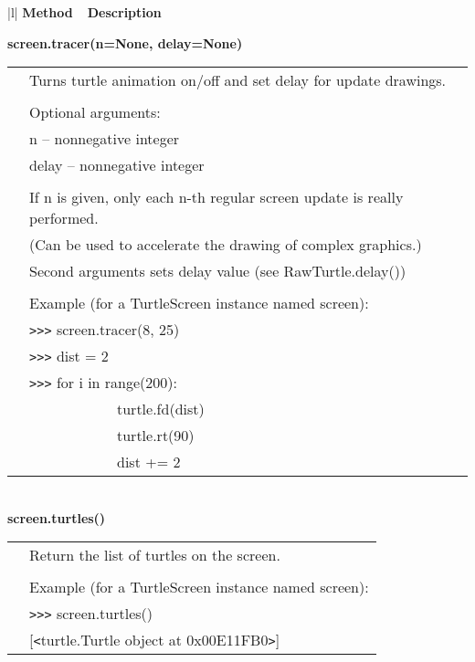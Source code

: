 \begin{center}
{\small
\begin{tabular}{|l|} \hline
{\bf Method~~Description}  \\ \hline\hline 



{\bf    screen.tracer(n=None, delay=None)} \\
   \begin{tabular}{p{0.25in}p{4in}}
&        Turns turtle animation on/off and set delay for update drawings. \\
&  \\
&        Optional arguments: \\
&        n -- nonnegative  integer \\
&        delay -- nonnegative  integer \\
&  \\
&        If n is given, only each n-th regular screen update is really performed. \\
&        (Can be used to accelerate the drawing of complex graphics.) \\
&        Second arguments sets delay value (see RawTurtle.delay()) \\
&  \\
&        Example (for a TurtleScreen instance named screen): \\
&        \verb+>+\verb+>+\verb+>+ screen.tracer(8, 25) \\
&        \verb+>+\verb+>+\verb+>+ dist = 2 \\
&        \verb+>+\verb+>+\verb+>+ for i in range(200): \\
&                ~~~~~~~~~~~~turtle.fd(dist) \\
&                ~~~~~~~~~~~~turtle.rt(90) \\
&                ~~~~~~~~~~~~dist += 2 \\
\end{tabular} \\ \hline
{\bf    screen.turtles()} \\
   \begin{tabular}{p{0.25in}p{4in}}
&        Return the list of turtles on the screen. \\
&  \\
&        Example (for a TurtleScreen instance named screen): \\
&        \verb+>+\verb+>+\verb+>+ screen.turtles() \\
&        [\verb+<+turtle.Turtle object at 0x00E11FB0\verb+>+] \\

\end{tabular}
\end{tabular}}
\end{center}
